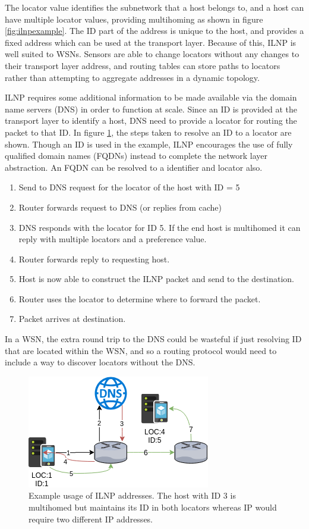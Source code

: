 \documentclass[12pt]{article}
\begin{document}
The locator value identifies the subnetwork that a host belongs to, and a host can have multiple locator values, providing multihoming as shown in figure \ref{fig:ilnpexample}. The ID part of the address is unique to the host, and provides a fixed address which can be used at the transport layer. Because of this, ILNP is well suited to WSNs. Sensors are able to change locators without any changes to their transport layer address, and routing tables can store paths to locators rather than attempting to aggregate addresses in a dynamic topology.

ILNP requires some additional information to be made available via the domain name servers (DNS) in order to function at scale. Since an ID is provided at the transport layer to identify a host, DNS need to provide a locator for routing the packet to that ID. In figure \ref{fig:ilnpdns}, the steps taken to resolve an ID to a locator are shown. Though an ID is used in the example, ILNP encourages the use of fully qualified domain names (FQDNs) instead to complete the network layer abstraction. An FQDN can be resolved to a identifier and locator also.

\begin{enumerate}
	\item Send to DNS request for the locator of the host with ID = 5
	\item Router forwards request to DNS (or replies from cache)
	\item DNS responds with the locator for ID 5. If the end host is multihomed it can reply with multiple locators and a preference value.
	\item Router forwards reply to requesting host.
	\item Host is now able to construct the ILNP packet and send to the destination.
	\item Router uses the locator to determine where to forward the packet.
	\item Packet arrives at destination.
\end{enumerate}

In a WSN, the extra round trip to the DNS could be wasteful if just resolving ID that are located within the WSN, and so a routing protocol would need to include a way to discover locators without the DNS.

\begin{figure}[!ht]
	\centering
	\includegraphics[width=0.6\linewidth]{images/ilnpdns}
	\caption{Example usage of ILNP addresses. The host with ID 3 is multihomed but maintains its ID in both locators whereas IP would require two different IP addresses.}
	\label{fig:ilnpdns}
\end{figure}
\end{document}
